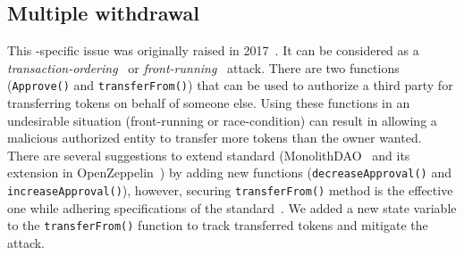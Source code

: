\subsection{Multiple withdrawal}

This \erc-specific issue was originally raised in 2017~\cite{MikVlad,TomHale}. It can be considered as a \textit{transaction-ordering}~\cite{OrderingAttack} or \textit{front-running}~\cite{eskandari2019sok} attack. There are two \erc functions (\ie \texttt{Approve()} and \texttt{transferFrom()}) that can be used to authorize a third party for transferring tokens on behalf of someone else. Using these functions  in an undesirable situation (\ie front-running or race-condition) can result in allowing a malicious authorized entity to transfer more tokens than the owner wanted. There are several suggestions to extend \erc standard (\eg MonolithDAO~\cite{MonolithDAO} and its extension in OpenZeppelin~\cite{OpenZepplin}) by adding new functions (\ie \texttt{decreaseApproval()} and \texttt{increaseApproval()}), however, securing \texttt{transferFrom()} method is the effective one while adhering specifications of the \erc standard~\cite{ERC20MWA}. We added a new state variable to the \texttt{transferFrom()} function to track transferred tokens and mitigate the attack. 

%

